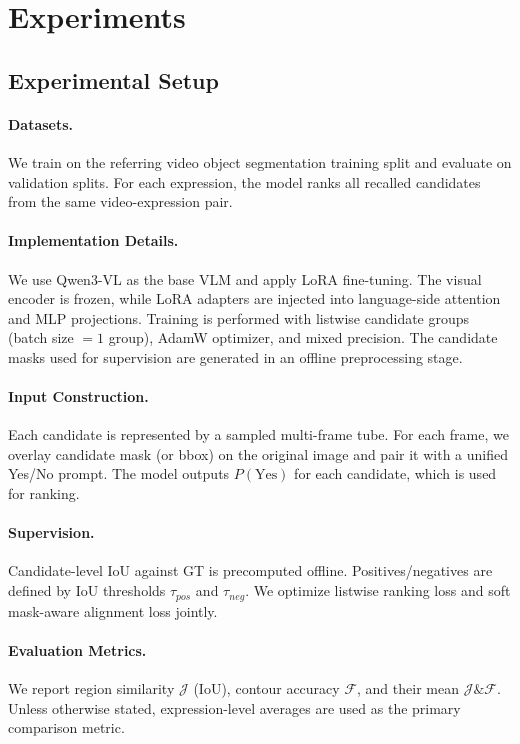 \section{Experiments}

\subsection{Experimental Setup}
\paragraph{Datasets.}
We train on the referring video object segmentation training split and evaluate on validation splits.
For each expression, the model ranks all recalled candidates from the same video-expression pair.

\paragraph{Implementation Details.}
We use Qwen3-VL as the base VLM and apply LoRA fine-tuning.
The visual encoder is frozen, while LoRA adapters are injected into language-side attention and MLP projections.
Training is performed with listwise candidate groups (batch size $=1$ group), AdamW optimizer, and mixed precision.
The candidate masks used for supervision are generated in an offline preprocessing stage.

\paragraph{Input Construction.}
Each candidate is represented by a sampled multi-frame tube.
For each frame, we overlay candidate mask (or bbox) on the original image and pair it with a unified Yes/No prompt.
The model outputs $P(\text{Yes})$ for each candidate, which is used for ranking.

\paragraph{Supervision.}
Candidate-level IoU against GT is precomputed offline.
Positives/negatives are defined by IoU thresholds $\tau_{pos}$ and $\tau_{neg}$.
We optimize listwise ranking loss and soft mask-aware alignment loss jointly.

\paragraph{Evaluation Metrics.}
We report region similarity $\mathcal{J}$ (IoU), contour accuracy $\mathcal{F}$, and their mean $\mathcal{J}\&\mathcal{F}$.
Unless otherwise stated, expression-level averages are used as the primary comparison metric.

